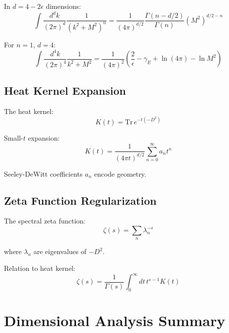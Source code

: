 \documentclass[11pt,a4paper]{article}
\theoremstyle{definition}
\begin{document}
In $d = 4 - 2\epsilon$ dimensions:
\begin{equation}
\label{eq:dimreg-1}
\int \frac{d^d k}{(2\pi)^d} \frac{1}{(k^2 + M^2)^n} =
  \frac{1}{(4\pi)^{d/2}} \frac{\Gamma(n - d/2)}{\Gamma(n)} (M^2)^{d/2 - n}
\end{equation}

For $n = 1$, $d = 4$:
\begin{equation}
\label{eq:dimreg-2}
\int \frac{d^4 k}{(2\pi)^4} \frac{1}{k^2 + M^2} =
  \frac{1}{(4\pi)^2} \left(\frac{2}{\epsilon} - \gamma_E + \ln(4\pi) - \ln M^2\right)
\end{equation}

\subsection{Heat Kernel Expansion}
\label{subsec:heat-kernel}

The heat kernel:
\begin{equation}
\label{eq:heat-kernel-def}
K(t) = \text{Tr}\, e^{-t(-D^2)}
\end{equation}

Small-$t$ expansion:
\begin{equation}
\label{eq:heat-kernel-exp}
K(t) = \frac{1}{(4\pi t)^{d/2}} \sum_{n=0}^{\infty} a_n t^n
\end{equation}

Seeley-DeWitt coefficients $a_n$ encode geometry.

\subsection{Zeta Function Regularization}
\label{subsec:zeta-reg}

The spectral zeta function:
\begin{equation}
\label{eq:zeta-def}
\zeta(s) = \sum_n \lambda_n^{-s}
\end{equation}

where $\lambda_n$ are eigenvalues of $-D^2$.

Relation to heat kernel:
\begin{equation}
\label{eq:zeta-heat}
\zeta(s) = \frac{1}{\Gamma(s)} \int_0^{\infty} dt \, t^{s-1} K(t)
\end{equation}

\section{Dimensional Analysis Summary}
\label{sec:dim-summary}
\end{document}
